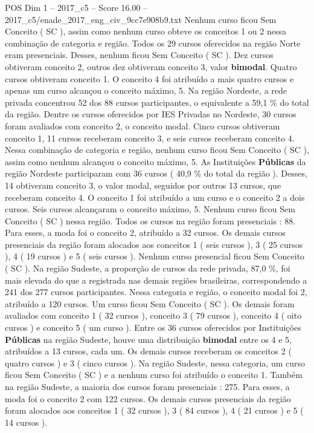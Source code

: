 \begin{textsample}{POS Dim 1 – 2017\_c5 – Score 16.00 – 2017\_c5/enade\_2017\_eng\_civ\_9cc7e908b9.txt}
Nenhum curso ficou Sem Conceito ( SC ), assim como nenhum curso obteve os conceitos 1 ou 2 nessa combinação de categoria e região.
Todos os 29 cursos oferecidos na região Norte eram presenciais.
Desses, nenhum ficou Sem Conceito ( SC ).
Dez cursos obtiveram conceito 2, outros dez obtiveram conceito 3, valor \textbf{bimodal}.
Quatro cursos obtiveram conceito 1.
O conceito 4 foi atribuído a mais quatro cursos e apenas um curso alcançou o conceito máximo, 5.
Na região Nordeste, a rede privada concentrou 52 dos 88 cursos participantes, o equivalente a 59,1 \% do total da região.
Dentre os cursos oferecidos por IES Privadas no Nordeste, 30 cursos foram avaliados com conceito 2, o conceito modal.
Cinco cursos obtiveram conceito 1, 11 cursos receberam conceito 3, e seis cursos receberam conceito 4.
Nessa combinação de categoria e região, nenhum curso ficou Sem Conceito ( SC ), assim como nenhum alcançou o conceito máximo, 5.
As Instituições \textbf{Públicas} da região Nordeste participaram com 36 cursos ( 40,9 \% do total da região ).
Desses, 14 obtiveram conceito 3, o valor modal, seguidos por outros 13 cursos, que receberam conceito 4.
O conceito 1 foi atribuído a um curso e o conceito 2 a dois cursos.
Seis cursos alcançaram o conceito máximo, 5.
Nenhum curso ficou Sem Conceito ( SC ) nessa região.
Todos os cursos na região foram presenciais : 88.
Para esses, a moda foi o conceito 2, atribuído a 32 cursos.
Os demais cursos presenciais da região foram alocados aos conceitos 1 ( seis cursos ), 3 ( 25 cursos ), 4 ( 19 cursos ) e 5 ( seis cursos ).
Nenhum curso presencial ficou Sem Conceito ( SC ).
Na região Sudeste, a proporção de cursos da rede privada, 87,0 \%, foi mais elevada do que a registrada nas demais regiões brasileiras, correspondendo a 241 dos 277 cursos participantes.
Nessa categoria e região, o conceito modal foi 2, atribuído a 120 cursos.
Um curso ficou Sem Conceito ( SC ).
Os demais foram avaliados com conceito 1 ( 32 cursos ), conceito 3 ( 79 cursos ), conceito 4 ( oito cursos ) e conceito 5 ( um curso ).
Entre os 36 cursos oferecidos por Instituições \textbf{Públicas} na região Sudeste, houve uma distribuição \textbf{bimodal} entre os 4 e 5, atribuídos a 13 cursos, cada um.
Os demais cursos receberam os conceitos 2 ( quatro cursos ) e 3 ( cinco cursos ).
Na região Sudeste, nessa categoria, um curso ficou Sem Conceito ( SC ) e a nenhum curso foi atribuído o conceito 1.
Também na região Sudeste, a maioria dos cursos foram presenciais : 275.
Para esses, a moda foi o conceito 2 com 122 cursos.
Os demais cursos presenciais da região foram alocados aos conceitos 1 ( 32 cursos ), 3 ( 84 cursos ), 4 ( 21 cursos ) e 5 ( 14 cursos ).

\end{textsample}
